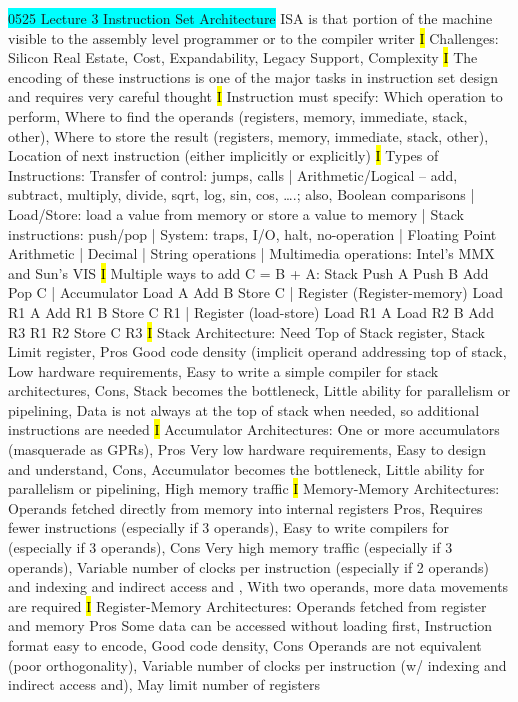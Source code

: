 \documentclass[fontsize=4pt]{scrartcl}
\begin{document}
\colorbox{Cyan}{0525 Lecture 3 Instruction Set Architecture} ISA is that portion of the machine visible to the assembly level programmer or to the compiler writer
\hl{I}
Challenges: Silicon Real Estate, Cost, Expandability, Legacy Support, Complexity
\hl{I}
The encoding of these instructions is one of the major tasks in instruction set design and requires very careful thought
\hl{I}
Instruction must specify: Which operation to perform, Where to find the operands (registers, memory, immediate, stack, other), Where to store the result (registers, memory, immediate, stack, other), Location of next instruction (either implicitly or explicitly)
\hl{I}
Types of Instructions: Transfer of control: jumps, calls | Arithmetic/Logical – add, subtract, multiply, divide, sqrt, log, sin, cos, ….; also, Boolean comparisons | Load/Store: load a value from memory or store a value to memory | Stack instructions: push/pop | System: traps, I/O, halt, no-operation | Floating Point Arithmetic | Decimal | String operations | Multimedia operations: Intel’s MMX and Sun’s VIS
\hl{I}
Multiple ways to add C = B + A: Stack Push A Push B Add Pop C | Accumulator Load A Add B Store C | Register (Register-memory) Load R1 A Add R1 B Store C R1 | Register (load-store) Load R1 A Load R2 B Add R3 R1 R2 Store C R3
\hl{I}
Stack Architecture: Need Top of Stack register, Stack Limit register, Pros Good code density (implicit operand addressing top of stack, Low hardware requirements, Easy to write a simple compiler for stack architectures, Cons, Stack becomes the bottleneck, Little ability for parallelism or pipelining, Data is not always at the top of stack when needed, so additional instructions are needed
\hl{I}
Accumulator Architectures: One or more accumulators (masquerade as GPRs), Pros Very low hardware requirements, Easy to design and understand, Cons, Accumulator becomes the bottleneck, Little ability for parallelism or pipelining, High memory traffic
\hl{I}
Memory-Memory Architectures: Operands fetched directly from memory into internal registers Pros, Requires fewer instructions (especially if 3 operands), Easy to write compilers for (especially if 3 operands), Cons Very high memory traffic (especially if 3 operands), Variable number of clocks per instruction (especially if 2 operands) and indexing and indirect access and , With two operands, more data movements are required
\hl{I}
Register-Memory Architectures: Operands fetched from register and memory Pros Some data can be accessed without loading first, Instruction format easy to encode, Good code density, Cons Operands are not equivalent (poor orthogonality), Variable number of clocks per instruction (w/ indexing and indirect access and), May limit number of registers 
\end{document}
